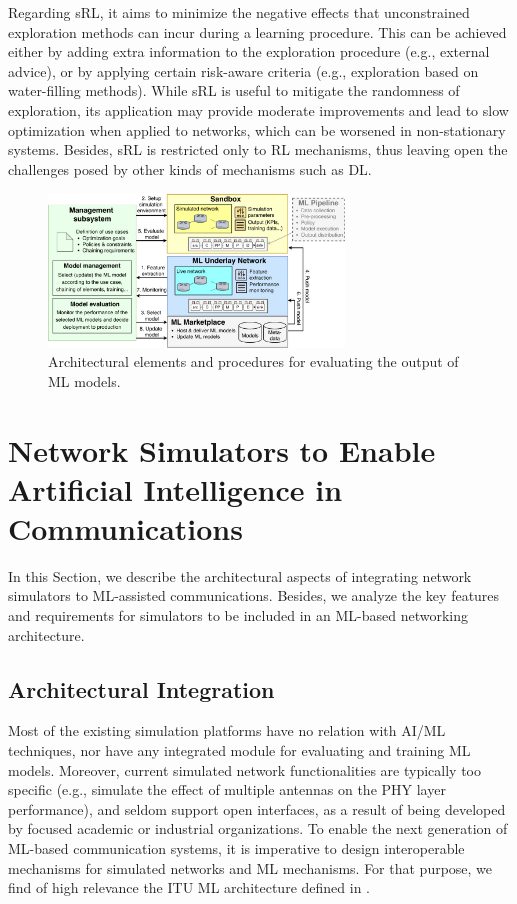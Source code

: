 \documentclass[journal]{IEEEtran}
\begin{document}
	Regarding sRL, it aims to minimize the negative effects that unconstrained exploration methods can incur during a learning procedure. This can be achieved either by adding extra information to the exploration procedure (e.g., external advice), or by applying certain risk-aware criteria (e.g., exploration based on water-filling methods). While sRL is useful to mitigate the randomness of exploration, its application may provide moderate improvements and lead to slow optimization when applied to networks, which can be worsened in non-stationary systems. Besides, sRL is restricted only to RL mechanisms, thus leaving open the challenges posed by other kinds of mechanisms such as DL.
	
	\begin{figure}[ht!]
		\centering
		\includegraphics[width=0.7\textwidth]{architecture_example.pdf}
		\caption{Architectural elements and procedures for evaluating the output of ML models.}
		\label{fig:example_simulator}
	\end{figure}
		
	\section{Network Simulators to Enable Artificial Intelligence in Communications}	
	In this Section, we describe the architectural aspects of integrating network simulators to ML-assisted communications. Besides, we analyze the key features and requirements for simulators to be included in an ML-based networking architecture.
	
	\subsection{Architectural Integration}
	Most of the existing simulation platforms have no relation with AI/ML techniques, nor have any integrated module for evaluating and training ML models. Moreover, current simulated network functionalities are typically too specific (e.g., simulate the effect of multiple antennas on the PHY layer performance), and seldom support open interfaces, as a result of being developed by focused academic or industrial organizations. To enable the next generation of ML-based communication systems, it is imperative to design interoperable mechanisms for simulated networks and ML mechanisms. For that purpose, we find of high relevance the ITU ML architecture defined in \cite{ITU3172}.	
	
\end{document}
